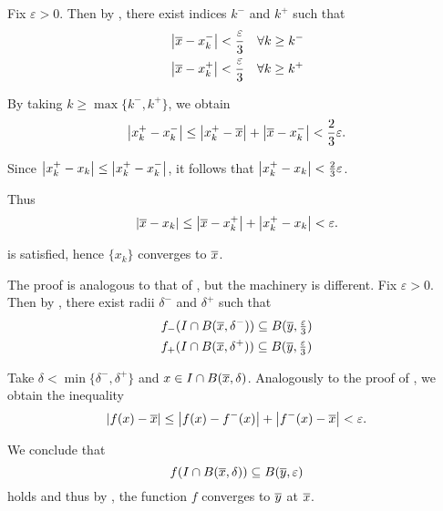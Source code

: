 \begin{RefListProof}
     Fix \( \varepsilon > 0 \). Then by , there exist indices \( k^- \) and \( k^+ \) such that
    \begin{align*}
      &\left\vert \overline{x} - x_k^- \right\vert < \frac \varepsilon 3 \quad\forall k \geq k^- \\
      &\left\vert \overline{x} - x_k^+ \right\vert < \frac \varepsilon 3 \quad\forall k \geq k^+
    \end{align*}

    By taking \( k \geq \max \{ k^-, k^+ \} \), we obtain
    \begin{equation*}
      \left\vert x_k^+ - x_k^- \right\vert \leq \left\vert x_k^+ - \overline{x} \right\vert + \left\vert \overline{x} - x_k^- \right\vert < \frac 2 3 \varepsilon.
    \end{equation*}

    Since \( \left\vert x_k^+ - x_k \right\vert \leq \left\vert x_k^+ - x_k^- \right\vert \), it follows that \( \left\vert x_k^+ - x_k \right\vert < \frac 2 3 \varepsilon \).

    Thus
    \begin{equation*}
      \left\vert \overline{x} - x_k \right\vert \leq \left\vert \overline{x} - x_k^+ \right\vert + \left\vert x_k^+ - x_k \right\vert < \varepsilon.
    \end{equation*}

     is satisfied, hence \( \{ x_k \} \) converges to \( \overline{x} \).

     The proof is analogous to that of , but the machinery is different. Fix \( \varepsilon > 0 \). Then by , there exist radii \( \delta^- \) and \( \delta^+ \) such that
    \begin{align*}
      &f_-(I \cap B(\overline{x}, \delta^-)) \subseteq B(\overline{y}, \tfrac \varepsilon 3) \\
      &f_+(I \cap B(\overline{x}, \delta^+)) \subseteq B(\overline{y}, \tfrac \varepsilon 3)
    \end{align*}

    Take \( \delta < \min \{ \delta^-, \delta^+ \} \) and \( x \in I \cap B(\overline{x}, \delta) \). Analogously to the proof of , we obtain the inequality
    \begin{equation*}
      \left\vert f(x) - \overline{x} \right\vert \leq \left\vert f(x) - f^-(x) \right\vert + \left\vert f^-(x) - \overline{x} \right\vert < \varepsilon.
    \end{equation*}

    We conclude that
    \begin{equation*}
      f(I \cap B(\overline{x}, \delta)) \subseteq B(\overline{y}, \varepsilon)
    \end{equation*}
    holds and thus by , the function \( f \) converges to \( \overline{y} \) at \( \overline{x} \).
\end{RefListProof}

